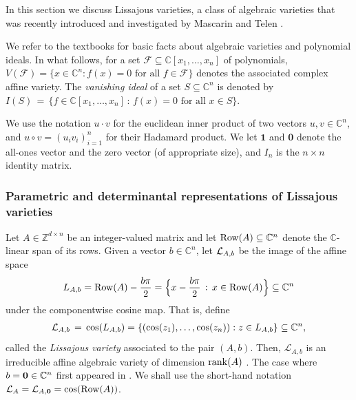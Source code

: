 \documentclass[a4paper, 11pt, twoside]{article}
\newcommand{\C}{\mathbb{C}}
\newcommand{\MF}{{\mathcal F}}
\newcommand{\Row}{{\text{\rm Row}}}
\newcommand{\ML}{{\mathcal L}}
\newcommand{\ao}{\mathbf {1}}
\newcommand{\azero}{\mathbf{0}}
\theoremstyle{plain}
\begin{document}
In this section we discuss Lissajous varieties, a class of   algebraic varieties that was recently introduced and investigated by Mascarin and Telen  
 \cite{mascarin2025lissajousvarieties}.
 
We refer to the textbooks \cite{CoxLittleOShea2005UsingAG,cox2025ideals} for basic facts about algebraic varieties and polynomial  ideals. In what follows, for a set $\MF\subseteq \C[x_1,\ldots,x_n]$ of polynomials, $V(\MF)=\{x\in\C^n: f(x)=0 \text{ for all } f\in\MF\}$ denotes the associated complex affine variety.  The \emph{vanishing ideal} of a set $S \subseteq \mathbb{C}^n$ is denoted by $I(S) \, = \, \{ f \in \mathbb{C}[x_1,\ldots, x_n] \, : \, f(x) = 0 \text{ for all } x \in S \}$. 

We use the notation $u\cdot v$ for the euclidean inner product of two vectors $u,v\in\C^n$, and $u\circ v=(u_iv_i)_{i=1}^n$ for their Hadamard product. We let $\ao$ and $\azero$ denote the all-ones vector and the zero vector (of appropriate size), and $I_n$ is the $n\times n$ identity matrix.
 

\subsubsection*{Parametric and determinantal representations of Lissajous varieties}

Let $A \in \mathbb{Z}^{d \times n}$ be an integer-valued  matrix and let ${\rm Row}(A) \subseteq \mathbb{C}^n$ denote the $\mathbb{C}$-linear span of its rows. 
Given a  vector $b \in \mathbb{C}^n$, let ${\cal L}_{A,b}$ be the image of the affine space 
\begin{align*}
L_{A,b} = {\rm Row}(A) -  \frac{b\pi}{2} =\Big \{ x -  \frac{b \pi}{2}\, : \, x \in {\rm Row}(A)\Big\} \subseteq \mathbb{C}^n
\end{align*}
 under the componentwise cosine map. That is, define
\begin{align*}
{\cal L}_{A,b} \, = \, {\rm cos}(L_{A,b}) =\{(\cos(z_1),\dotsc,\cos(z_n)): z\in L_{A,b}\}\subseteq \C^n,
\end{align*}
called the {\em Lissajous variety} associated to the pair $(A,b)$. Then, $\ML_{A,b}$  is an irreducible affine algebraic variety of dimension ${\rm rank}(A)$   \cite[Lemma 2.1]{mascarin2025lissajousvarieties}.
The case where $b= {\bf 0} \in \mathbb{C}^n$ first appeared in \cite[Section 5]{BelAfiaMeroniTelen2025Chebyshev}. We shall use the short-hand notation ${\cal L}_A = {\cal L}_{A,{\bf 0}}=\cos(\Row(A))$. 
 
\end{document}

